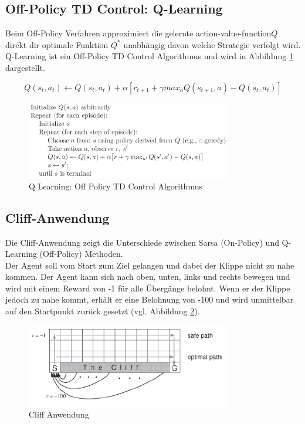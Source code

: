 \documentclass[10pt]{scrartcl}
\begin{document}
\subsection{Off-Policy TD Control: Q-Learning}
Beim Off-Policy Verfahren approximiert die gelernte \glqq action-value-function\grqq\xspace $Q$  direkt dir optimale Funktion $Q^{*}$ unabhängig davon welche Strategie verfolgt wird. Q-Learning ist ein Off-Policy TD Control Algorithmus und wird in Abbildung \ref{fig:QLearning} dargestellt.
 
\begin{equation}
Q(s_{t},a_{t}) \leftarrow Q(s_{t},a_{t}) + \alpha [r_{t+1} + \gamma max_{a} Q(s_{t+1},a) - Q(s_{t},a_{t})]
\end{equation} 
 
\begin{figure}[htbp]
	\centering	\includegraphics[width=0.8\textwidth]{Bilder/Q-Learning.png}
	\caption{Q Learning: Off Policy TD Control Algorithmus}
	\label{fig:QLearning}
\end{figure}

\subsection{Cliff-Anwendung}
Die Cliff-Anwendung zeigt die Unterschiede zwischen Sarsa (On-Policy) und Q-Learning (Off-Policy) Methoden.\\
Der Agent soll vom Start zum Ziel gelangen und dabei der Klippe nicht zu nahe kommen. Der Agent kann sich nach oben, unten, links und rechts bewegen und wird mit einem Reward von -1 für alle Übergänge belohnt. Wenn er der Klippe jedoch zu nahe kommt, erhält er eine Belohnung von -100 und wird unmittelbar auf den Startpunkt zurück gesetzt (vgl. Abbildung \ref{fig:Cliff}).

\begin{figure}[htbp]
	\centering	\includegraphics[width=0.8\textwidth]{Bilder/Cliff.png}
	\caption{Cliff Anwendung \cite[Vgl.][S. 186]{sutton:2005}}
	\label{fig:Cliff}
\end{figure}
\end{document}
